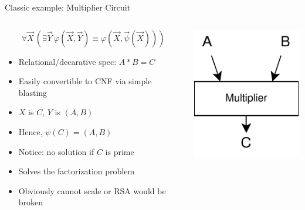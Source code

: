 \documentclass[aspectratio=169]{beamer}
\begin{document}
\begin{frame}{Classic example: Multiplier Circuit}
\begin{columns}
\begin{column}{0.68\textwidth}
        \[
            \forall \vec{X}\, \left( \exists \vec{Y}\, \varphi(\vec{X}, \vec{Y}) \equiv \varphi(\vec{X}, \vec{\psi}(\vec{X})) \right)
        \]
\begin{itemize}
    \item Relational/decarative spec: $A * B = C$
    \item Easily convertible to CNF via simple blasting
    \item $X$ is $C$, $Y$ is $(A, B)$
    \item Hence, $\psi(C) = (A, B)$
    \item Notice: no solution if $C$ is prime
    \item Solves the factorization problem
    \item Obviously cannot scale or RSA would be broken
\end{itemize}
\end{column}
\begin{column}{0.28\textwidth}
    \includegraphics[scale=1.2]{mult.pdf}
\end{column}
\end{columns}
\end{frame}
\end{document}

